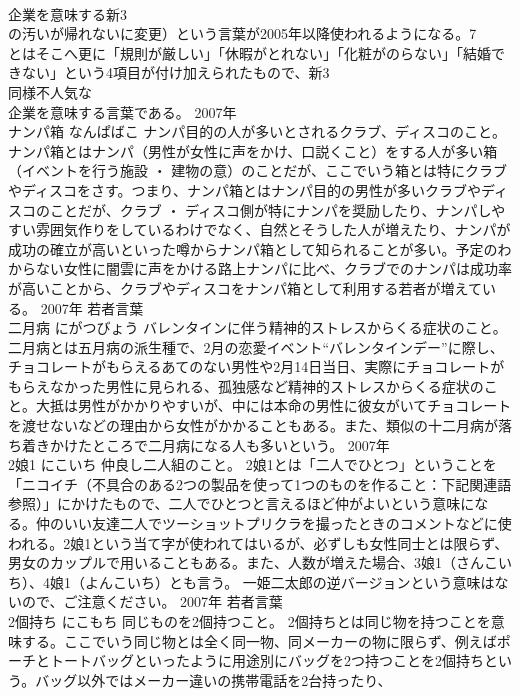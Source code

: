 \documentclass[8pt]{extreport}
\begin{document}
\begin{CJK}{UTF8}{min}
\\	企業を意味する新3
\\	の汚いが帰れないに変更）という言葉が2005年以降使われるようになる。7
\\	とはそこへ更に「規則が厳しい」「休暇がとれない」「化粧がのらない」「結婚できない」という4項目が付け加えられたもので、新3
\\	同様不人気な
\\	企業を意味する言葉である。	2007年	
\\	ナンパ箱	なんぱばこ	ナンパ目的の人が多いとされるクラブ、ディスコのこと。	ナンパ箱とはナンパ（男性が女性に声をかけ、口説くこと）をする人が多い箱（イベントを行う施設 ・ 建物の意）のことだが、ここでいう箱とは特にクラブやディスコをさす。つまり、ナンパ箱とはナンパ目的の男性が多いクラブやディスコのことだが、クラブ ・ ディスコ側が特にナンパを奨励したり、ナンパしやすい雰囲気作りをしているわけでなく、自然とそうした人が増えたり、ナンパが成功の確立が高いといった噂からナンパ箱として知られることが多い。予定のわからない女性に闇雲に声をかける路上ナンパに比べ、クラブでのナンパは成功率が高いことから、クラブやディスコをナンパ箱として利用する若者が増えている。	2007年	若者言葉	
\\	二月病	にがつびょう	バレンタインに伴う精神的ストレスからくる症状のこと。	二月病とは五月病の派生種で、2月の恋愛イベント“バレンタインデー”に際し、チョコレートがもらえるあてのない男性や2月14日当日、実際にチョコレートがもらえなかった男性に見られる、孤独感など精神的ストレスからくる症状のこと。大抵は男性がかかりやすいが、中には本命の男性に彼女がいてチョコレートを渡せないなどの理由から女性がかかることもある。また、類似の十二月病が落ち着きかけたところで二月病になる人も多いという。	2007年	
\\	2娘1	にこいち	仲良し二人組のこと。	2娘1とは「二人でひとつ」ということを「ニコイチ（不具合のある2つの製品を使って1つのものを作ること：下記関連語参照）」にかけたもので、二人でひとつと言えるほど仲がよいという意味になる。仲のいい友達二人でツーショットプリクラを撮ったときのコメントなどに使われる。2娘1という当て字が使われてはいるが、必ずしも女性同士とは限らず、男女のカップルで用いることもある。また、人数が増えた場合、3娘1（さんこいち）、4娘1（よんこいち）とも言う。 一姫二太郎の逆バージョンという意味はないので、ご注意ください。	2007年	若者言葉	
\\	2個持ち	にこもち	同じものを2個持つこと。	2個持ちとは同じ物を持つことを意味する。ここでいう同じ物とは全く同一物、同メーカーの物に限らず、例えばポーチとトートバッグといったように用途別にバッグを2つ持つことを2個持ちという。バッグ以外ではメーカー違いの携帯電話を2台持ったり、

\end{CJK}
\end{document}
